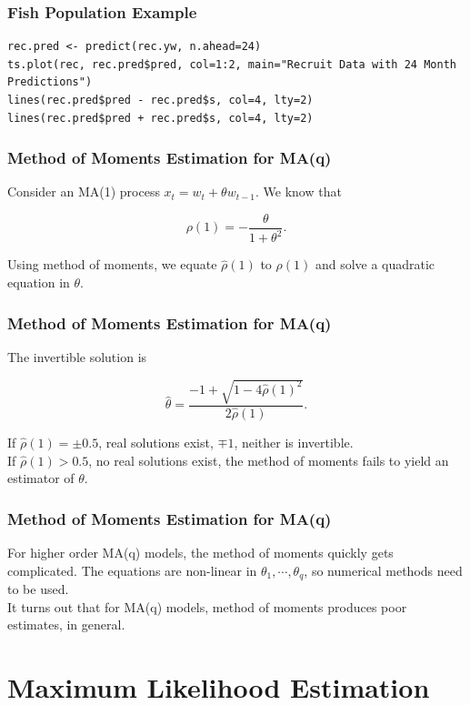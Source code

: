 \documentclass[%
xcolor=pdftex]{beamer}
\begin{document}
\begin{frame}[fragile]
\frametitle{Fish Population Example}

\begin{verbatim}
rec.pred <- predict(rec.yw, n.ahead=24)
ts.plot(rec, rec.pred$pred, col=1:2, main="Recruit Data with 24 Month Predictions")
lines(rec.pred$pred - rec.pred$s, col=4, lty=2)
lines(rec.pred$pred + rec.pred$s, col=4, lty=2)
\end{verbatim}

\end{frame}

\begin{frame}
\frametitle{Method of Moments Estimation for MA(q)}

Consider an MA(1) process $x_t = w_t + \theta w_{t-1}$. We know that

$$
\rho(1) = -\frac{\theta}{1 + \theta^2}.
$$

Using method of moments, we equate $\hat{\rho}(1)$ to $\rho(1)$ and solve a quadratic equation in $\theta$.


\end{frame}

\begin{frame}
\frametitle{Method of Moments Estimation for MA(q)}

The invertible solution is

$$
\hat{\theta} = \frac{-1 + \sqrt{1 - 4 \hat{\rho}(1)^2}}{2 \hat{\rho}(1)}.
$$

If $\hat{\rho}(1)= \pm 0.5$, real solutions exist, $\mp 1$, neither is invertible. \\
If $\hat{\rho}(1)>0.5$, no real solutions exist, the method of moments fails to yield an estimator of $\theta$.

\end{frame}

\begin{frame}
\frametitle{Method of Moments Estimation for MA(q)}

For higher order MA(q) models, the method of moments quickly gets complicated. The equations are non-linear in $\theta_1, \cdots, \theta_q$, so numerical methods need to be used. \\
\vspace{5mm}
It turns out that for MA(q) models, method of moments produces poor estimates, in general.
\end{frame}

\section{Maximum Likelihood Estimation}
\frame{\tableofcontents[currentsection]}
\end{document}
